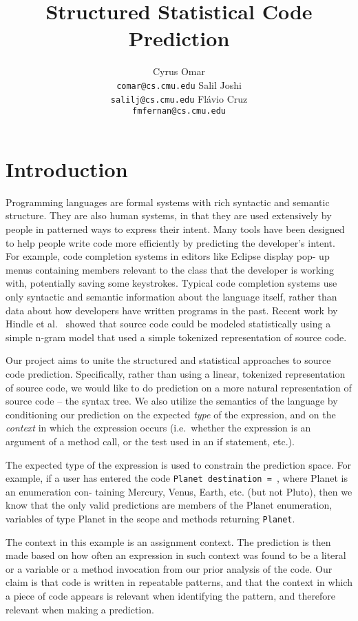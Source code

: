 \documentclass{article} %
\title{Structured Statistical Code Prediction}
\author{
  Cyrus Omar\\
  \texttt{comar@cs.cmu.edu}
  \And
  Salil Joshi\\
  \texttt{salilj@cs.cmu.edu}
  \And Fl\'avio Cruz\\
  \texttt{fmfernan@cs.cmu.edu}
}
\begin{document}
\maketitle

\section*{Introduction}
Programming languages are formal systems with rich syntactic and semantic structure. They are
also human systems, in that they are used extensively by people in patterned ways to express their
intent. Many tools have been designed to help people write code more efficiently by predicting
the developer's intent. For example, code completion systems in editors like Eclipse display pop-
up menus containing members relevant to the class that the developer is working with, potentially
saving some keystrokes. Typical code completion systems use only syntactic and semantic
information about the language itself, rather than data about how developers have written programs
in the past. Recent work by Hindle et al.~\cite{Hindle:2012:NS:2337223.2337322} showed that source code could be modeled statistically
using a simple n-gram model that used a simple tokenized representation of source code.

Our project aims to unite the structured and statistical approaches to source code prediction.
Specifically, rather than using a linear, tokenized representation of source code, we would like to do
prediction on a more natural representation of source code – the syntax tree.  We also utilize the semantics of the language by conditioning our prediction on the expected \emph{type} of the expression, and on the \emph{context} in which the expression occurs (i.e.\ whether the expression is an argument of a method call, or the test used in an if statement, etc.).

The expected type of the expression is used to constrain the prediction space.  For example, if a
user has entered the code \texttt{Planet destination = }, where Planet is an enumeration con-
taining Mercury, Venus, Earth, etc. (but not Pluto), then we know that the only valid predictions are members of the Planet enumeration, variables of type Planet in the scope and methods returning \texttt{Planet}.

The context in this example is an assignment context. The prediction is then made based on how often an expression in such context was found to be a literal or a variable or a method invocation from our prior analysis of the code. Our claim is that code is written in repeatable patterns, and that the context in which a piece of code appears is relevant when identifying the pattern, and therefore relevant when making a prediction.
\end{document}
